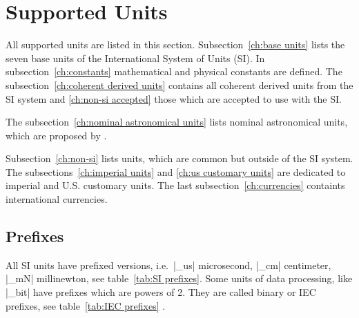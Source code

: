 \documentclass{ltxdoc}
\begin{document}
\newpage
\section{Supported Units}
\label{ch:Supported Units}

All supported units are listed in this section. Subsection~\ref{ch:base units} lists the seven base units of the International System of Units (SI). In subsection~\ref{ch:constants}  mathematical and physical constants are defined. The subsection~\ref{ch:coherent derived units} contains all coherent derived units from the SI system and \ref{ch:non-si accepted} those which are accepted to use with the SI.

The subsection~\ref{ch:nominal astronomical units} lists nominal astronomical units, which are proposed by \cite{iau16}.

Subsection~\ref{ch:non-si} lists units, which are common but outside of the SI system. The subsections~\ref{ch:imperial units} and \ref{ch:us customary units} are dedicated to imperial and U.S. customary units. The last subsection~\ref{ch:currencies} containts international currencies.


\renewcommand{\arraystretch}{1.5}

\subsection{Prefixes}

All SI units have prefixed versions, i.e.\ |_us| microsecond, |_cm| centimeter, |_mN| millinewton, see table~\ref{tab:SI prefixes}. Some units of data processing, like |_bit| have prefixes which are powers of 2. They are called binary or IEC prefixes, see table~\ref{tab:IEC prefixes} \cite[121]{bipm06}.
\end{document}
